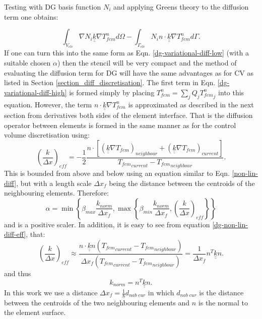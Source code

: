 Testing with DG basis function $N_i$ and applying Greens theory to the diffusion term one obtains:

\begin{equation}
\int_{V_{ele}} \nabla N_i \underline {\underline k} \nabla T_{fem}^n d\Omega
-\int_{\Gamma_{ele}} N_i n\cdot \underline {\underline k} \nabla T_{fem}^n d\Gamma .
\label{dg-variational-diff-high}
\end{equation}
If one can turn this into the same form as Eqn. \ref{dg-variational-diff-low} (with a suitable chosen $\alpha$) then the stencil will be very compact and the method of evaluating the diffusion term for DG will have the same advantages as for CV as listed in Section \ref{section_diff_discretisation}.  The first term in Eqn. \ref{dg-variational-diff-high} is formed simply by placing  $T_{fem}^n=\sum_j Q_j {T_{fem}^n}_j$ into this equation. However, the term $n\cdot \underline {\underline k} \nabla T_{fem}^n $ is approximated as described in the next section from derivatives both sides of the element interface. That is the diffusion operator between elements is formed in the same manner as for the control volume discretisation using:
\begin{equation}
\left( \frac{k}{\Delta x} \right)_{eff} =
- \frac{1}{2} \frac{ n\cdot \left[\left({\underline{\underline k}} \nabla T_{fem}\right)_{neighbour} + \left({\underline{\underline k}} \nabla T_{fem}\right)_{current} \right] }{{T_{fem}}_{current}-{T_{fem}}_{neighbour}} .
\label{dg-non-lin-diff-eff}
\end{equation}
This is bounded from above and below using an equation similar to Eqn. \ref{non-lin-diff}, but with a length scale $\Delta x_f$ being the distance between the centroids of the neighbouring elements. Therefore:
\begin{equation}
\alpha=\min\left\{  \beta_{max}\frac{k_{norm}}{{\Delta x}_{f}} , \max\left\{ \beta_{min}\frac{k_{norm}}{{\Delta x}_{f}} ,
\left( \frac{k}{\Delta x} \right)_{eff}
\right\} \right\}
\label{dg-alpha-def}
\end{equation}
and is a positive scaler. In addition, it is easy to see from equation
\ref{dg-non-lin-diff-eff}, that:
\begin{equation}
\left( \frac{k}{\Delta x} \right)_{eff} \approx
  \frac{ n\cdot {\underline{\underline k}} n({T_{fem}}_{current}-{T_{fem}}_{neighbour}) }
{{\Delta x}_{f}({T_{fem}}_{current}-{T_{fem}}_{neighbour})}
=\frac{1}{{\Delta x}_{f}} { n}^T {\underline{\underline k}} { n}.
\label{k-norm-full}
\end{equation}
and thus
\begin{equation}
k_{norm}={ n}^T {\underline{\underline k}} { n}.
\label{k-norm}
\end{equation}
In this work we use a distance $\Delta x_f=\frac{1}{8} d_{nab\;cur}$ in
which $d_{nab\;cur}$ is the distance between the centroids of the two neighbouring elements and $n$ is the normal to the element surface.


